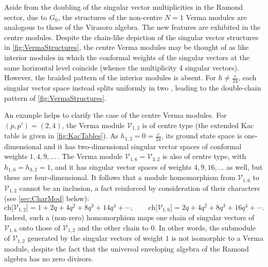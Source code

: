 \documentclass[a4paper,reqno,12pt]{report}
\theoremstyle{definition}
\numberwithin{equation}{section}
\newcommand{\Ver}[1]{\mathcal{V}_{#1}}       %
\newcommand{\chmap}{\mathrm{ch}}
\newcommand{\Gr}[1]{\bigl[ #1 \bigr]}            %
\newcommand{\ch}[1]{\chmap \Gr{#1}}              %
\newcommand{\uea}{universal enveloping algebra}
\newcommand{\sv}{singular vector}
\newcommand{\svs}{singular vectors}
\theoremstyle{plain}
\begin{document}
Aside from the doubling of the \sv{} multiplicities in the Ramond sector, due to $G_0$, the structures of the non-centre $N=1$ Verma modules are analogous to those of the Virasoro algebra.  The new features are exhibited in the centre modules.  Despite the chain-like depiction of the \sv{} structures in \cref{fig:VermaStructures}, the centre Verma modules may be thought of as like interior modules in which the conformal weights of the \svs{} at the same horizontal level coincide (whence the multiplicity $4$ \svs{}).  However, the braided pattern of the interior modules is absent.  For $h \neq \frac{c}{24}$, each \sv{} space instead splits uniformly in two \cite{IohRepI03}, leading to the double-chain pattern of \cref{fig:VermaStructures}.

An example helps to clarify the case of the centre Verma modules.  For $(p,p') = (2,4)$, the Verma module $\Ver{1,2}$ is of centre type (the extended Kac table is given in \cref{fig:KacTables}).  As $h_{1,2} = 0 = \frac{c}{24}$, its ground state space is one-dimensional and it has two-dimensional \sv{} spaces of conformal weights $1, 4, 9, \ldots$\,.  The Verma module $\Ver{1,6} = \Ver{3,2}$ is also of centre type, with $h_{1,6} = h_{3,2} = 1$, and it has \sv{} spaces of weights $4, 9, 16, \ldots$ as well, but these are four-dimensional.  It follows that a module homomorphism from $\Ver{1,6}$ to $\Ver{1,2}$ cannot be an inclusion, a fact reinforced by consideration of their characters (see \cref{sec:CharMod} below):
\begin{equation}
\ch{\Ver{1,2}} = 1 + 2q + 4q^2 + 8q^3 + 14q^4 + \cdots, \qquad \ch{\Ver{1,6}} = 2q + 4q^2 + 8q^3 + 16q^4 + \cdots.
\end{equation}
Indeed, such a (non-zero) homomorphism maps one chain of \svs{} of $\Ver{1,6}$ onto those of $\Ver{1,2}$ and the other chain to $0$.  In other words, the submodule of $\Ver{1,2}$ generated by the \svs{} of weight $1$ is not isomorphic to a Verma module, despite the fact \cite{AubZer85} that the \uea{} of the Ramond algebra has no zero divisors.
\end{document}
